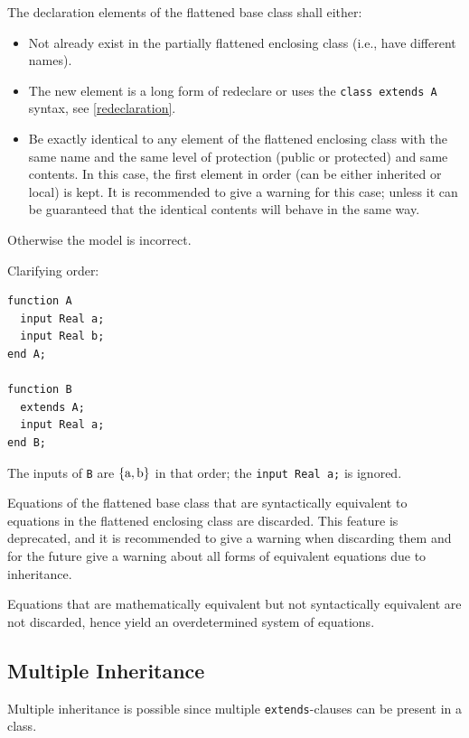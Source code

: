 The declaration elements of the flattened base class shall either:
\begin{itemize}
\item
  Not already exist in the partially flattened enclosing class (i.e., have different names).
\item
  The new element is a long form of redeclare or uses the \lstinline!class extends A! syntax, see \cref{redeclaration}.
\item
  Be exactly identical to any element of the flattened enclosing class with the same name and the same level of protection (public or protected) and same contents.
  In this case, the first element in order (can be either inherited or local) is kept.
  It is recommended to give a warning for this case; unless it can be guaranteed that the identical contents will behave in the same way.
\end{itemize}
Otherwise the model is incorrect.

\begin{nonnormative}
Clarifying order:
\begin{lstlisting}[language=modelica]
function A
  input Real a;
  input Real b;
end A;

function B
  extends A;
  input Real a;
end B;
\end{lstlisting}
The inputs of \lstinline!B! are $\{\text{\lstinline!a!}, \text{\lstinline!b!}\}$ in that order; the \lstinline!input Real a;! is ignored.
\end{nonnormative}

Equations of the flattened base class that are syntactically equivalent to equations in the flattened enclosing class are discarded.
This feature is deprecated, and it is recommended to give a warning when discarding them and for the future give a warning about all forms of equivalent equations due to inheritance.

\begin{nonnormative}
Equations that are mathematically equivalent but not syntactically equivalent are not discarded, hence yield an overdetermined system of equations.
\end{nonnormative}


\subsection{Multiple Inheritance}\label{multiple-inheritance}

Multiple inheritance is possible since multiple \lstinline!extends!-clauses can be present in a class.

